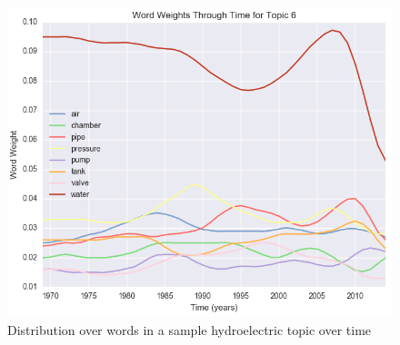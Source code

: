 \begin{figure}[ht]
\centering
\includegraphics[width=130mm,scale=0.45]{Figures/wwttTopic6}
\decoRule
\caption[wwttTopic6]{Distribution over words in a sample hydroelectric topic over time}
\label{fig:wwttTopic6}
\end{figure}









